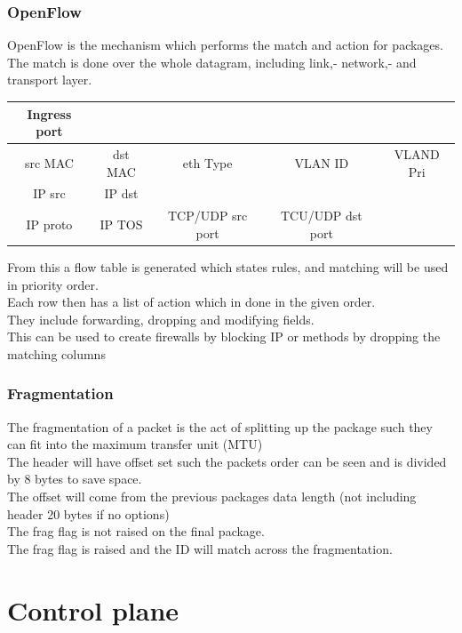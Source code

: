 \documentclass[12pt, a4paper]{article}
\begin{document}
			\subsubsection{OpenFlow}
				OpenFlow is the mechanism which performs the match and action for packages.\\
				The match is done over the whole datagram, including link,- network,- and transport layer.\\ 
				\begin{tabular}{|c|c|c|c|c||}
				\hline
				Ingress port &&&&\\
				\hline
				src MAC & dst MAC & eth Type & VLAN ID & VLAND Pri \\
				\hline
				IP src & IP dst &&&\\
				\hline
				IP proto & IP TOS & TCP/UDP src port & TCU/UDP dst port&\\
				\hline
				\end{tabular}
				From this a flow table is generated which states rules, and matching will be used in priority order.\\
				Each row then has a list of action which in done in the given order.\\
				They include forwarding, dropping and modifying fields.\\
				This can be used to create firewalls by blocking IP or methods by dropping the matching columns
			\subsubsection{Fragmentation}
				The fragmentation of a packet is the act of splitting up the package such they can fit into the maximum transfer unit (MTU)\\
				The header will have offset set such the packets order can be seen and is divided by 8 bytes to save space.\\
				The offset will come from the previous packages data length (not including header 20 bytes if no options)\\
				The frag flag is not raised on the final package. \\
				The frag flag is raised and the ID will match across the fragmentation.\\
	\section{Control plane}
\end{document}
